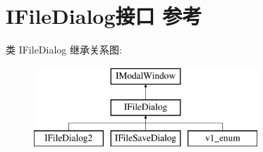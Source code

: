 \hypertarget{interface_i_file_dialog}{}\section{I\+File\+Dialog接口 参考}
\label{interface_i_file_dialog}
类 I\+File\+Dialog 继承关系图\+:\begin{figure}[H]
\begin{center}
\leavevmode
\includegraphics[height=3.000000cm]{interface_i_file_dialog}
\end{center}
\end{figure}
